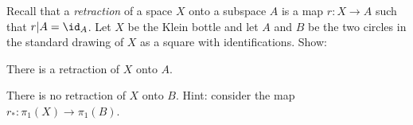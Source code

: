Recall that a \emph{retraction} of a space $X$ onto a subspace $A$ is
a map $r:X\rightarrow A$ such that $r|A=\id_A$. Let $X$ be the Klein
bottle and let $A$ and $B$ be the two circles in the standard drawing
of $X$ as a square with identifications. Show:
\begin{alist}
\item There is a retraction of $X$ onto $A$.
\item There is no retraction of $X$ onto $B$. Hint: consider the map
$r_{*}:\pi_1(X)\rightarrow \pi_1(B)$.
\end{alist}
